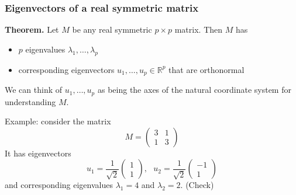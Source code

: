 \documentclass[smaller,handout]{beamer}
\def\R{{\mathbb R}}
\def\darkgreen{\color{green!60!black}}
\def\v2{{\vskip.2in}}
\def\R{{\mathbb R}}
\begin{document}
\begin{frame}
\frametitle{Eigenvectors of a real symmetric matrix}

{\bf Theorem.} Let $M$ be any real symmetric $p \times p$ matrix. Then $M$ has
\begin{itemize}
\item $p$ eigenvalues $\lambda_1, \ldots, \lambda_p$
\item corresponding eigenvectors $u_1, \ldots, u_p \in \R^p$ that are orthonormal
\end{itemize}

\pause\v2
\alert{We can think of $u_1, \ldots, u_p$ as being the axes of the natural coordinate 
system for understanding $M$.}

\pause\v2
{\darkgreen Example: consider the matrix
$$ M = \begin{pmatrix} 3 & 1 \\ 1 & 3 \end{pmatrix} $$
It has eigenvectors
$$ u_1 = \frac{1}{\sqrt{2}} \begin{pmatrix} 1 \\ 1 \end{pmatrix}, \ \ \ 
u_2 = \frac{1}{\sqrt{2}} \begin{pmatrix} -1 \\ 1 \end{pmatrix} $$
and corresponding eigenvalues $\lambda_1 = 4$ and $\lambda_2 = 2$. (Check)}
\end{frame}
\end{document}
